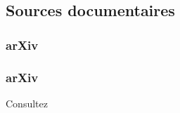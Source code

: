 \subsection{Sources documentaires}

\begin{frame}
  \frametitle{arXiv}
\end{frame}

\begin{frame}
  \frametitle{arXiv}
  Consultez 
\end{frame}
